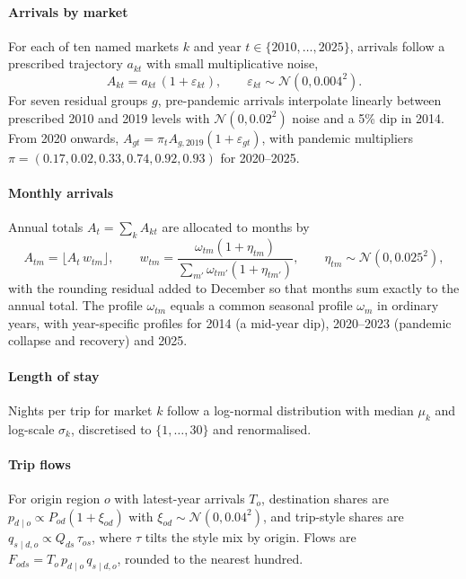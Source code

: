 \documentclass{article}
\begin{document}
\paragraph{Arrivals by market}
For each of ten named markets $k$ and year $t \in \{2010,\dots,2025\}$, arrivals follow a prescribed
trajectory $a_{kt}$ with small multiplicative noise,
\begin{equation}
A_{kt} = a_{kt}\,(1 + \varepsilon_{kt}), \qquad \varepsilon_{kt} \sim \mathcal{N}(0, 0.004^2).
\end{equation}
For seven residual groups $g$, pre-pandemic arrivals interpolate linearly between prescribed 2010 and 2019
levels with $\mathcal{N}(0, 0.02^2)$ noise and a 5\% dip in 2014. From 2020 onwards,
$A_{gt} = \pi_t A_{g,2019}(1+\varepsilon_{gt})$, with pandemic multipliers
$\pi = (0.17, 0.02, 0.33, 0.74, 0.92, 0.93)$ for 2020--2025.

\paragraph{Monthly arrivals}
Annual totals $A_t = \sum_k A_{kt}$ are allocated to months by
\begin{equation}
A_{tm} = \lfloor A_t\, w_{tm} \rfloor, \qquad
w_{tm} = \frac{\omega_{tm}(1+\eta_{tm})}{\sum_{m'} \omega_{tm'}(1+\eta_{tm'})}, \qquad
\eta_{tm} \sim \mathcal{N}(0, 0.025^2),
\end{equation}
with the rounding residual added to December so that months sum exactly to the annual total. The profile
$\omega_{tm}$ equals a common seasonal profile $\omega_m$ in ordinary years, with year-specific profiles for
2014 (a mid-year dip), 2020--2023 (pandemic collapse and recovery) and 2025.

\paragraph{Length of stay}
Nights per trip for market $k$ follow a log-normal distribution with median $\mu_k$ and log-scale
$\sigma_k$, discretised to $\{1,\dots,30\}$ and renormalised.

\paragraph{Trip flows}
For origin region $o$ with latest-year arrivals $T_o$, destination shares are
$p_{d\mid o} \propto P_{od}(1+\xi_{od})$ with $\xi_{od} \sim \mathcal{N}(0, 0.04^2)$, and trip-style shares
are $q_{s\mid d,o} \propto Q_{ds}\,\tau_{os}$, where $\tau$ tilts the style mix by origin. Flows are
$F_{ods} = T_o\, p_{d\mid o}\, q_{s\mid d,o}$, rounded to the nearest hundred.
\end{document}
